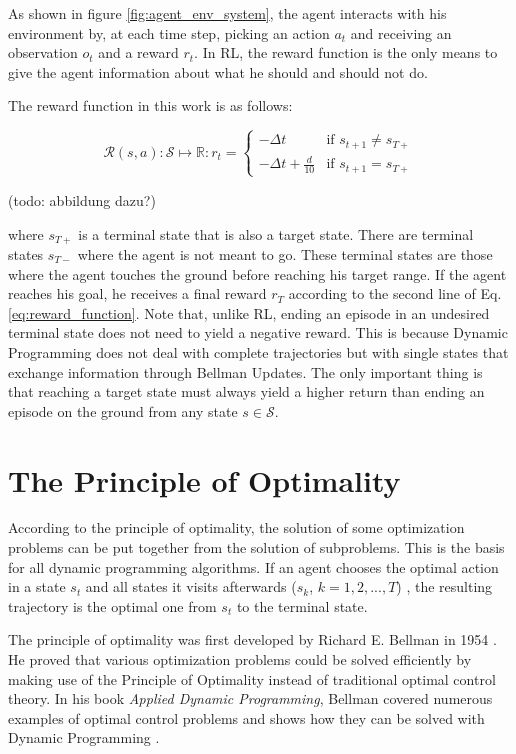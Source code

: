 As shown in figure \ref{fig:agent_env_system}, the agent interacts with his environment by, at each time step, picking an action $a_t$ and receiving an observation $o_t$ and a reward $r_t$. In RL, the reward function is the only means to give the agent information about what he should and should not do.

The reward function in this work is as follows:

\begin{equation}
\mathcal{R}(s,a): \mathcal{S} \mapsto \mathbb{R}: r_t =
\begin{cases}
-\Delta t & \text{if } s_{t+1} \neq s_{T+}\\
-\Delta t + \frac{d}{10} & \text{if } s_{t+1} = s_{T+}
\end{cases}
\label{eq:reward_function}
\end{equation}

(todo: abbildung dazu?)

where $s_{T+}$ is a terminal state that is also a target state. There are terminal states $s_{T-}$ where the agent is not meant to go. These terminal states are those where the agent touches the ground before reaching his target range. If the agent reaches his goal, he receives a final reward $r_T$ according to the second line of Eq. \ref{eq:reward_function}. Note that, unlike RL, ending an episode in an undesired terminal state does not need to yield a negative reward. This is because Dynamic Programming does not deal with complete trajectories but with single states that exchange information through Bellman Updates. The only important thing is that reaching a target state must always yield a higher return than ending an episode on the ground from any state $s \in \mathcal{S}$.


\section{The Principle of Optimality}
\label{sec:optimality}

According to the principle of optimality, the solution of some optimization problems can be put together from the solution of subproblems. This is the basis for all dynamic programming algorithms. If an agent chooses the optimal action in a state $s_t$ and all states it visits afterwards ($s_k$, $k=1, 2, ...,T$) , the resulting trajectory is the optimal one from $s_t$ to the terminal state.

The principle of optimality was first developed by Richard E. Bellman in 1954 \cite{Bellman1954}. He proved that various optimization problems could be solved efficiently by making use of the Principle of Optimality instead of traditional optimal control theory. In his book \textit{Applied Dynamic Programming}, Bellman covered numerous examples of optimal control problems and shows how they can be solved with Dynamic Programming \cite{Bellman1962}.


